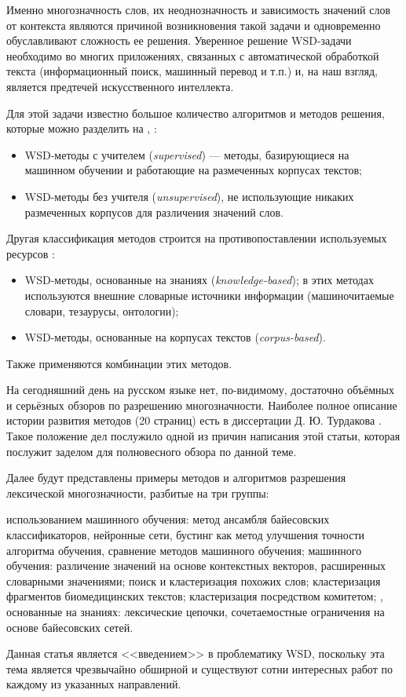 \documentclass{article}
\begin{document}
\begin{articletext}
Именно многозначность слов, их неоднозначность и зависимость значений слов от контекста являются причиной возникновения такой задачи и одновременно обуславливают сложность ее решения. Уверенное решение WSD-задачи необходимо во многих приложениях, связанных с автоматической обработкой текста (информационный поиск, машинный перевод и т.п.) и, на наш взгляд, является предтечей искусственного интеллекта.

Для этой задачи известно большое количество алгоритмов и методов решения, которые можно разделить на \cite{Lukash 2011}, \cite{Navigli 2009}: 

\begin{itemize}
\item WSD-методы с учителем (\textit{supervised}) --- методы, базирующиеся на машинном обучении и работающие на размеченных корпусах текстов; 
\item WSD-методы без учителя (\textit{unsupervised}), не использующие никаких размеченных корпусов для различения значений слов.
\end{itemize}

Другая классификация методов строится на противопоставлении используемых ресурсов \cite{Navigli 2009}:
\begin{itemize}
\item WSD-методы, основанные на знаниях (\textit{knowledge-based}); в этих методах используются внешние словарные источники информации (машиночитаемые словари, тезаурусы, онтологии);
\item WSD-методы, основанные на корпусах текстов (\textit{corpus-based}).
\end{itemize}

Также применяются комбинации этих методов.

На сегодняшний день на русском языке нет, по-видимому, достаточно объёмных и серьёзных обзоров по разрешению многозначности. Наиболее полное описание истории развития методов (20 страниц) есть в диссертации Д. Ю. Турдакова \cite{Trudakov 2010}. Такое положение дел послужило одной из причин написания этой статьи, которая послужит заделом для полновесного обзора по данной теме.

Далее будут представлены примеры методов и алгоритмов разрешения лексической многозначности, разбитые на три группы: 
\begin{itemize}
 использованием машинного обучения: метод ансамбля байесовских классификаторов, нейронные сети, бустинг как метод улучшения точности алгоритма обучения, сравнение методов машинного обучения;
 машинного обучения: различение значений на основе контекстных векторов, расширенных словарными значениями; поиск и кластеризация похожих слов; кластеризация фрагментов биомедицинских текстов; кластеризация посредством комитетом;
, основанные на знаниях: лексические цепочки, сочетаемостные ограничения на основе байесовских сетей.
\end{itemize}
 Данная статья является <<введением>> в проблематику WSD, поскольку эта тема является чрезвычайно обширной и существуют сотни интересных работ по каждому из указанных направлений.


\end{articletext}
\end{document}
